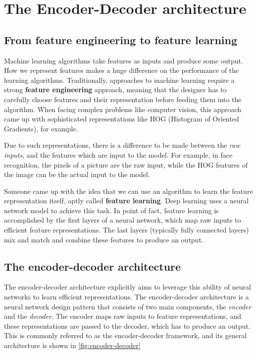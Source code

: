 \section{The Encoder-Decoder architecture}\label{sec:encoder-decoder}

\subsection{From feature engineering to feature learning}

Machine learning algorithms take features as inputs and produce some output. How we represent features makes a huge difference on the performance of the learning algorithms.  Traditionally, approaches to machine learning require a strong \textbf{feature engineering} approach, meaning that the designer has to carefully choose features and their representation before feeding them into the algorithm. When facing complex problems like computer vision, this approach came up with sophisticated representations like HOG (Histogram of Oriented Gradients), for example.

Due to such representations, there is a difference to be made between the \textit{raw inputs}, and the features which are input to the model. For example, in face recognition, the pixels of a picture are the raw input, while the HOG features of the image can be the actual input to the model.

Someone came up with the idea that we can use an algorithm to learn the feature representation itself, aptly called \textbf{feature learning}. Deep learning uses a neural network model to achieve this task. In point of fact, feature learning is accomplished by the first layers of a neural network, which map raw inputs to efficient feature representations. The last layers (typically fully connected layers) mix and match and combine these features to produce an output.

\subsection{The encoder-decoder architecture}

The encoder-decoder architecture explicitly aims to leverage this ability of neural networks to learn efficient representations. The encoder-decoder architecture is a neural network design pattern that consists of two main components, the \textit{encoder} and the \textit{decoder}.  The encoder maps raw inputs to feature representations, and these representations are passed to the decoder, which has to produce an output. This is commonly referred to as the encoder-decoder framework, and its general architecture is shown in \cref{fig:encoder-decoder}

